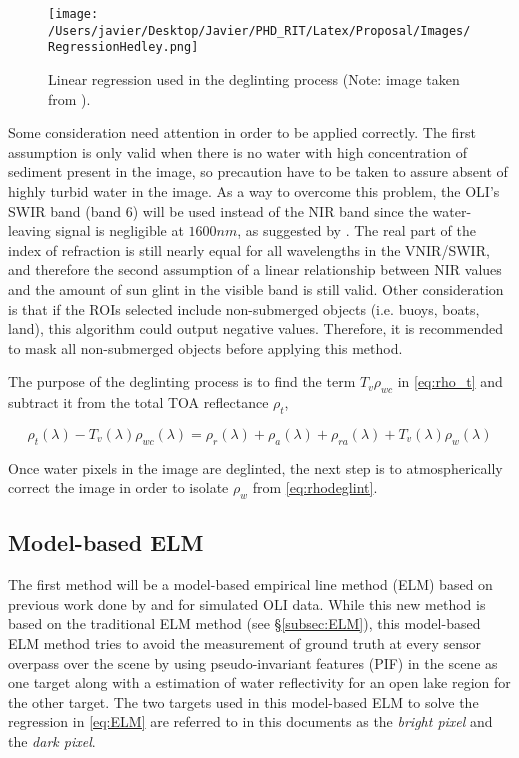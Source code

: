 \begin{figure}[!ht]
  \centering
  \texttt{[image: /Users/javier/Desktop/Javier/PHD\_RIT/Latex/Proposal/Images/RegressionHedley.png]}
  \caption{Linear regression used in the deglinting process (Note: image taken from \cite{Hedley:2005}). \label{fig:regressiohedley} } 
\end{figure}

Some consideration need attention in order to be applied correctly. The first assumption is only valid when there is no water with high concentration of sediment present in the image, so precaution have to be taken to assure absent of highly turbid water in the image. As a way to overcome this problem, the OLI's SWIR band (band 6) will be used instead of the NIR band since the water-leaving signal is negligible at $1600nm$, as suggested by \cite{GeraceThesis}. The real part of the index of refraction is still nearly equal for all wavelengths in the VNIR/SWIR, and therefore the second assumption of a linear relationship between NIR values and the amount of sun glint in the visible band is still valid. Other consideration is that if the ROIs selected include non-submerged objects (i.e. buoys, boats, land), this algorithm could output negative values. Therefore, it is recommended to mask all non-submerged objects before applying this method.


The purpose of the deglinting process is to find the term $T_v\rho_{wc}$ in \autoref{eq:rho_t} and subtract it from the total TOA reflectance $\rho_t$,

\begin{equation}\label{eq:rhodeglint}
  \rho_t(\lambda)-T_v(\lambda)\rho_{wc}(\lambda) = \rho_r(\lambda)+\rho_a(\lambda)+\rho_{ra}(\lambda)+T_v(\lambda)\rho_{w}(\lambda)
\end{equation}

Once water pixels in the image are deglinted, the next step is to atmospherically correct the image in order to isolate $\rho_w$ from \autoref{eq:rhodeglint}.



\subsection{Model-based ELM}
The first method will be a model-based empirical line method (ELM) based on previous work done by \cite{Gerace:2013} and \cite{Gerace:2012}  for simulated OLI data. While this new method is based on the traditional ELM method (see \S\ref{subsec:ELM}), this model-based ELM method tries to avoid the measurement of ground truth at every sensor overpass over the scene by using pseudo-invariant features (PIF)  in the scene as one target along with a estimation of water reflectivity for an open lake region for the other target. The two targets used in this model-based ELM to solve the regression in \autoref{eq:ELM} are referred to in this documents as the {\it bright pixel}  and the {\it dark pixel}.

